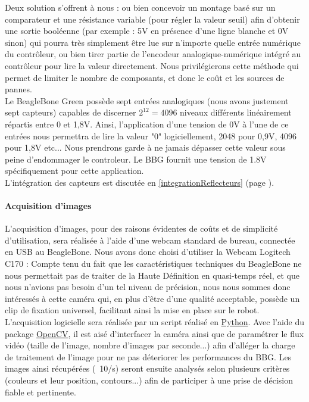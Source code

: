 			Deux solution s'offrent à nous : ou bien concevoir un montage basé sur un comparateur et une résistance variable (pour régler la valeur seuil) afin d'obtenir une sortie booléenne (par exemple : 5V en présence d'une ligne blanche et 0V sinon) qui pourra très simplement être lue sur n'importe quelle entrée numérique du contrôleur, ou bien tirer partie de l'encodeur analogique-numérique intégré au contrôleur pour lire la valeur directement. Nous privilégierons cette méthode qui permet de limiter le nombre de composants, et donc le coût et les sources de pannes.\\

			Le BeagleBone Green possède sept entrées analogiques (nous avons justement sept capteurs) capables de discerner $2^{12} = 4096$ niveaux différents linéairement répartis entre 0 et 1,8V\cite{bib6}.
			Ainsi, l'application d'une tension de 0V à l'une de ce entrées nous permettra de lire la valeur "0" logiciellement, 2048 pour 0,9V, 4096 pour 1,8V etc... Nous prendrons garde à ne jamais dépasser cette valeur sous peine d’endommager le controleur. Le BBG fournit une tension de 1.8V spécifiquement pour cette application\cite{bib6}.\\

			L'intégration des capteurs est discutée en \ref{integrationReflecteurs} (page \pageref{integrationReflecteurs}).

		\paragraph{Acquisition d'images}

			L'acquisition d'images, pour des raisons évidentes de coûts et  de simplicité d'utilisation, sera réalisée à l'aide d'une webcam standard de bureau, connectée en USB au BeagleBone. Nous avons donc choisi d'utiliser la Webcam Logitech C170 :
			Compte tenu du fait que les caractéristiques techniques du BeagleBone ne nous permettait pas de traiter de la Haute Définition en quasi-temps réel, et que nous n'avions pas besoin d'un tel niveau de précision, nous nous sommes donc intéressés à cette caméra qui, en plus d'être d'une qualité acceptable, possède un clip de fixation universel, facilitant ainsi la mise en place sur le robot. \\

			L'acquisition logicielle sera réalisée par un script réalisé en \href{https://www.python.org/}{Python}. Avec l'aide du package \href{https://www.http://opencv.org/}{OpenCV}, il est aisé d'interfacer la caméra ainsi que de paramétrer le flux vidéo (taille de l'image, nombre d'images par seconde...) afin d'alléger la charge de traitement de l'image pour ne pas déteriorer les performances du BBG. Les images ainsi récupérées (~10/s) seront ensuite analysés selon plusieurs critères (couleurs et leur position, contours...) afin de participer à une prise de décision fiable et pertinente.
			
